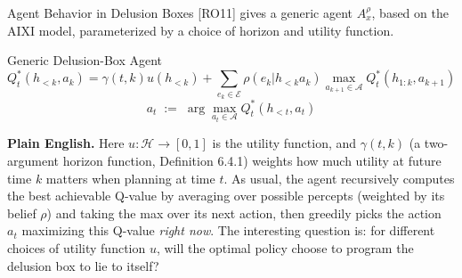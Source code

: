 \documentclass[aspectratio=169,10pt]{beamer}
\newcommand{\Ac}{\mathcal{A}}
\newcommand{\Ec}{\mathcal{E}}
\newcommand{\Hc}{\mathcal{H}}
\begin{document}
\begin{frame}{Agent Behavior in Delusion Boxes}
  [RO11] gives a generic agent $A^\rho_x$, based on the AIXI model,
  parameterized by a choice of horizon and utility function.

  \begin{block}{Generic Delusion-Box Agent}
    \[
      Q^*_t(h_{<k},a_k) = \gamma(t,k)u(h_{<k}) +
      \sum_{e_k\in\Ec}\rho(e_k|h_{<k}a_k)\max_{a_{k+1}\in\Ac}Q^*_t(h_{1:k},a_{k+1})
    \]
    \[
      a_t \;:=\; \arg\max_{a_t\in\Ac} Q^*_t(h_{<t},a_t)
    \]
  \end{block}
  \textbf{Plain English.} Here $u:\Hc\to[0,1]$ is the utility function,
  and $\gamma(t,k)$ (a two-argument horizon function, Definition 6.4.1)
  weights how much utility at future time $k$ matters when planning at
  time $t$. As usual, the agent recursively computes the best achievable
  Q-value by averaging over possible percepts (weighted by its belief
  $\rho$) and taking the max over its next action, then greedily picks the
  action $a_t$ maximizing this Q-value \emph{right now}. The interesting
  question is: for different choices of utility function $u$, will the
  optimal policy choose to program the delusion box to lie to itself?
\end{frame}
\end{document}
